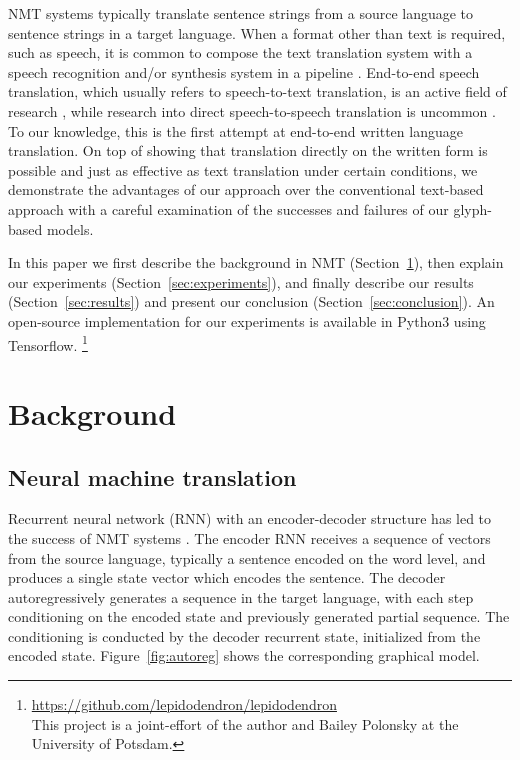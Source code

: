\documentclass[11pt,twocolumn]{article}
\begin{document}
NMT systems typically translate sentence strings from a source language
to sentence strings in a target language.
When a format other than text is required, such as speech,
it is common to compose the text translation system
with a speech recognition and/or synthesis system in a pipeline \parencite{speech-to-speech}.
End-to-end speech translation,
which usually refers to speech-to-text translation,
is an active field of research \parencite{berard2018end,vila2018end},
while research into direct speech-to-speech translation is uncommon \parencite{serdyuk2018towards}.
To our knowledge,
this is the first attempt at end-to-end written language translation.
On top of showing that translation directly on the written form is possible
and just as effective as text translation under certain conditions,
we demonstrate the advantages of our approach over the conventional text-based approach
with a careful examination of the successes and failures of our glyph-based models.

In this paper we first describe the background in NMT (Section~\ref{sec:background}),
then explain our experiments (Section~\ref{sec:experiments}),
and finally describe our results (Section~\ref{sec:results})
and present our conclusion (Section~\ref{sec:conclusion}).
An open-source implementation for our experiments is available in Python3 using Tensorflow.%
\footnote{\scriptsize{\url{https://github.com/lepidodendron/lepidodendron}}\\
  This project is a joint-effort of the author and Bailey Polonsky at the University of Potsdam.}

\section{Background}\label{sec:background}

\subsection{Neural machine translation}\label{sec:neur-mach-transl}

Recurrent neural network (RNN) with an encoder-decoder structure has led to the success of NMT systems
\parencite{kalchbrenner2013recurrent,sutskever2014sequence,cho2014learning,cho2014properties,wu2016google}.
The encoder RNN receives a sequence of vectors from the source language,
typically a sentence encoded on the word level,
and produces a single state vector which encodes the sentence.
The decoder autoregressively generates a sequence in the target language,
with each step conditioning on the encoded state and previously generated partial sequence.
The conditioning is conducted by the decoder recurrent state,
initialized from the encoded state.
Figure~\ref{fig:autoreg} shows the corresponding graphical model.
\end{document}

